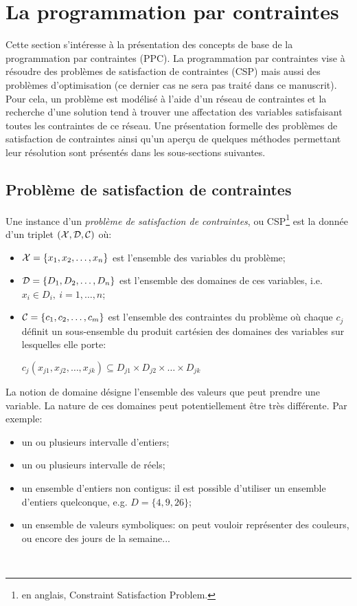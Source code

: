 \section{La programmation par contraintes}
\label{sec:PPC}
Cette section s'intéresse à la présentation des concepts de base de la
programmation par contraintes (PPC). La programmation par contraintes
vise à résoudre des problèmes de satisfaction de contraintes (CSP)
mais aussi des problèmes d'optimisation (ce dernier cas ne sera pas
traité dans ce manuscrit). Pour cela, un problème est
modélisé à l'aide d'un réseau de contraintes et la recherche d'une
solution tend à trouver une affectation des variables satisfaisant
toutes les contraintes de ce réseau. Une présentation formelle des
problèmes de satisfaction de contraintes ainsi qu'un aperçu de
quelques méthodes permettant leur résolution sont présentés dans les
sous-sections suivantes. 

\subsection{Problème de satisfaction de contraintes}

Une instance d'un {\it problème de satisfaction de contraintes}, ou
CSP\footnote{en anglais, Constraint Satisfaction Problem.} est
la donnée d'un triplet $({\cal X},{\cal D},{\cal C})$ où: 
\begin{itemize}
\item ${\cal X}=\{x_1,x_2,\dots,x_n\}$ est l'ensemble des variables du problème;
\item ${\cal D}=\{D_1,D_2,\dots,D_n\}$ est l'ensemble des domaines de ces
  variables, i.e. $x_i \in D_i,\ i=1,\dots,n$;
\item ${\cal C}=\{c_1,c_2,\dots,c_m\}$ est l'ensemble des contraintes du
  problème où chaque $c_j$ définit un sous-ensemble du produit
  cartésien des domaines des variables sur lesquelles elle porte:

  $c_j(x_{j1},x_{j2},\dots,x_{jk}) \subseteq D_{j1} \times D_{j2}
  \times \dots \times D_{jk}$
\end{itemize}

La notion de domaine désigne l'ensemble des valeurs que peut prendre
une variable. La nature de ces domaines peut potentiellement être très
différente. Par exemple:
\begin{itemize}
\item un ou plusieurs intervalle d'entiers;
\item un ou plusieurs intervalle de réels;
\item un ensemble d'entiers non contigus: il est possible d'utiliser
  un ensemble d'entiers quelconque, e.g. $D=\{4,9,26\}$;
\item un ensemble de valeurs symboliques: on peut vouloir représenter
  des couleurs, ou encore des jours de la semaine... 
\end{itemize}
~

